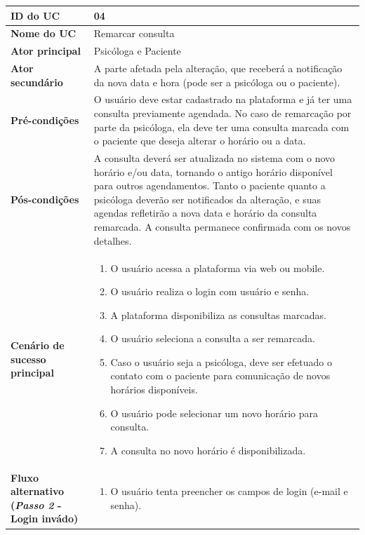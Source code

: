 \documentclass[a4paper,12pt]{report}
\begin{document}
\begin{longtable}{|p{4cm}|p{11.5cm}|}
    \hline
    \textbf{ID do UC} & \textbf{04} \\ \hline
    \textbf{Nome do UC} & Remarcar consulta\\ \hline
    \textbf{Ator principal} & Psicóloga e Paciente \\ \hline
    \textbf{Ator secundário} & A parte afetada pela alteração, que receberá a notificação da nova data e hora (pode ser a psicóloga ou o paciente). \\ \hline
    \textbf{Pré-condições} & O usuário deve estar cadastrado na plataforma e já ter uma consulta previamente agendada. No caso de remarcação por parte da psicóloga, ela deve ter uma consulta marcada com o paciente que deseja alterar o horário ou a data. \\ \hline
    \textbf{Pós-condições} & A consulta deverá ser atualizada no sistema com o novo horário e/ou data, tornando o antigo horário disponível para outros agendamentos. Tanto o paciente quanto a psicóloga deverão ser notificados da alteração, e suas agendas refletirão a nova data e horário da consulta remarcada. A consulta permanece confirmada com os novos detalhes. \\ \hline
    \textbf{Cenário de sucesso principal} & 
    \begin{enumerate}[leftmargin=*,labelsep=1em]
        \item  O usuário acessa a plataforma via web ou mobile.
        \item O usuário realiza o login com usuário e senha.
        \item  A plataforma disponibiliza as consultas marcadas.
        \item O usuário seleciona a consulta a ser remarcada.
        \item  Caso o usuário seja a psicóloga, deve ser efetuado o contato com o paciente para comunicação de novos horários disponíveis.
        \item  O usuário pode selecionar um novo horário para consulta.
        \item A consulta no novo horário é disponibilizada.
    \end{enumerate} \\ \hline
    \textbf{Fluxo alternativo (\textit{Passo 2} - Login invádo)} & 
    \begin{enumerate}[leftmargin=*,labelsep=1em]
        \item O usuário tenta preencher os campos de login (e-mail e senha).

\end{enumerate}
\end{longtable}
\end{document}
